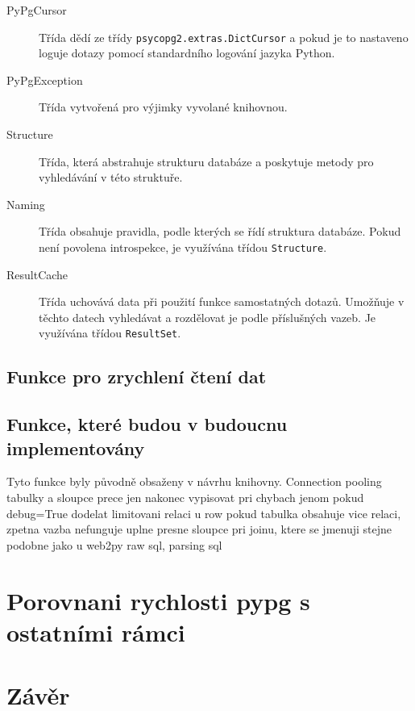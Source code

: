 \documentclass[ing,male,java,dept456]{diploma}						%
\begin{document}
\begin{description}
\item[PyPgCursor] Třída dědí ze třídy \lstinline[style=inlinepython]|psycopg2.extras.DictCursor| a pokud je to nastaveno loguje dotazy pomocí standardního logování jazyka Python.
\item[PyPgException] Třída vytvořená pro výjimky vyvolané knihovnou.
\item[Structure] Třída, která abstrahuje strukturu databáze a poskytuje metody pro vyhledávání v této struktuře. 
\item[Naming] Třída obsahuje pravidla, podle kterých se řídí struktura databáze. Pokud není povolena introspekce, je využívána třídou \lstinline[style=inlinepython]|Structure|.
\item[ResultCache] Třída uchovává data při použití funkce samostatných dotazů. Umožňuje v těchto datech vyhledávat a rozdělovat je podle příslušných vazeb. Je využívána třídou \lstinline[style=inlinepython]|ResultSet|.
\end{description}

\subsection{Funkce pro zrychlení čtení dat}

\subsection{Funkce, které budou v budoucnu implementovány}

Tyto funkce byly původně obsaženy v návrhu knihovny. 
Connection pooling
tabulky a sloupce prece jen nakonec vypisovat pri chybach jenom pokud debug=True
dodelat limitovani relaci u row
pokud tabulka obsahuje vice relaci, zpetna vazba nefunguje uplne presne
sloupce pri joinu, ktere se jmenuji stejne podobne jako u web2py
raw sql, parsing sql

\section{Porovnani rychlosti pypg s ostatními rámci}

\section{Závěr}
\label{sec:Conclusion}
\end{document}
